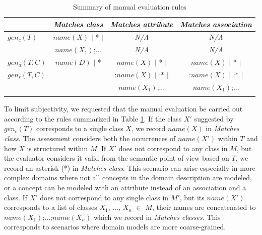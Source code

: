 \begin{table}[!h]
    \scriptsize
    \centering
    \setlength{\tabcolsep}{0.5em}
    \begin{tabular}{lccc}
                     & \emph{Matches class}        & \emph{Matches attribute} & \emph{Matches association} \\
\toprule
\addlinespace
        $gen_c(T)$   & $name(X)$ $\vert$ * $\vert$ & \emph{N/A}  & \emph{N/A} \\
                     & $name(X_1)$;$\ldots$        & \emph{N/A}  & \emph{N/A} \\
\addlinespace
\midrule
\addlinespace
        $gen_a(T,C)$ & $name(D)$ $\vert$ *         & $name(X)$ $\vert$ * $\vert$ & $name(X)$ $\vert$ * $\vert$ \\
        $gen_r(T,C)$ &                             & :$name(X)$ $\vert$ :* $\vert$ & :$name(X)$ $\vert$ :* $\vert$ \\
                     &                             & $name(X_1)$;$\ldots$        & $name(X_1)$;$\ldots$ \\
\addlinespace
\bottomrule
    \end{tabular}
    \caption{Summary of manual evaluation rules}
    \label{tab:manual-assessment-of-suggestions}
\end{table}

To limit subjectivity, we requested that the manual evaluation be carried out according to the rules summarized in Table \ref{tab:manual-assessment-of-suggestions}.
If the class $X'$ suggested by $gen_c(T)$ corresponds to a single class $X$, we record $name(X)$ in \emph{Matches class}.
The assessment considers both the occurrences of $name(X')$ within $T$ and how $X$ is structured within $M$.
If $X'$ does not correspond to any class in $M$, but the evaluator considers it valid from the semantic point of view based on $T$, we record an asterisk (*) in \emph{Matches class}.
This scenario can arise especially in more complex domains where not all concepts in the domain description are modeled, or a concept can be modeled with an attribute instead of an association and a class.
If $X'$ does not correspond to any single class in $M'$, but its $name(X')$ corresponds to a list of classes $X_1$, $\ldots$, $X_n$ $\in$ $M$, their names are concatenated to $name(X_1)$;$\ldots$;$name(X_n)$ which we record in \emph{Matches classes}.
This corresponds to scenarios where domain models are more coarse-grained.

